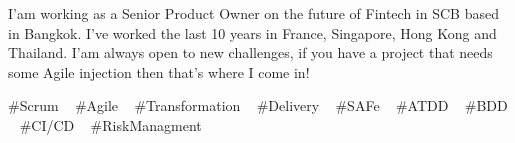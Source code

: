 

\begin{cvparagraph}


I'am working as a Senior Product Owner on the future of Fintech in SCB based in Bangkok.
I’ve worked the last 10 years in France, Singapore, Hong Kong and Thailand.
I'am always open to new challenges, if you have a project that needs some Agile injection then that’s where I come in!


\end{cvparagraph}
\begin{cvtechnologies}
 \#Scrum ~
 \#Agile ~
 \#Transformation ~
 \#Delivery  ~
 \#SAFe ~
 \#ATDD ~
 \#BDD ~
 \#CI/CD ~
 \#RiskManagment ~
\end{cvtechnologies}

